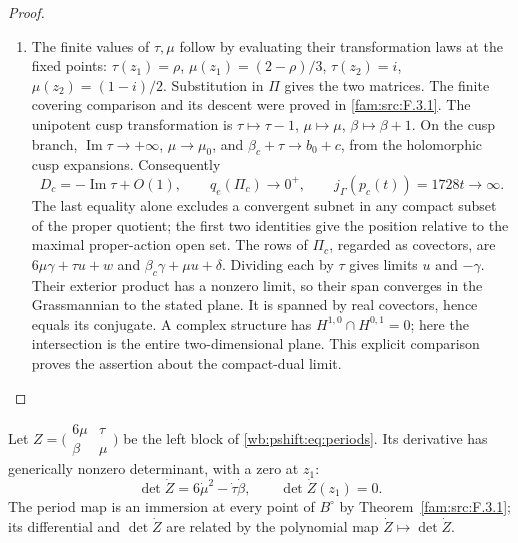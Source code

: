 \begin{proof}
\begin{enumerate}[label=\arabic*.,leftmargin=*]
\item The finite values of $\tau,\mu$ follow by evaluating their transformation
laws at the fixed points: $\tau(z_1)=\rho$,
$\mu(z_1)=(2-\rho)/3$, $\tau(z_2)=i$,
$\mu(z_2)=(1-i)/2$.  Substitution in $\Pi$ gives the two matrices.
The finite covering comparison and its descent were proved in \ref{fam:src:F.3.1}.
The unipotent cusp transformation is
$\tau\mapsto\tau-1$, $\mu\mapsto\mu$, $\beta\mapsto\beta+1$.
On the cusp branch, $\operatorname{Im}\tau\to+\infty$,
$\mu\to\mu_0$, and $\beta_c+\tau\to b_0+c$, from the holomorphic
cusp expansions.  Consequently
\[
 D_c=-\operatorname{Im}\tau+O(1),\qquad
 q_e(\Pi_c)\longrightarrow0^+,
 \qquad j_\Gamma(p_c(t))=1728t\longrightarrow\infty.
\]
The last equality alone excludes a convergent subnet in any compact
subset of the proper quotient; the first two identities give the
position relative to the maximal proper-action open set.
The rows of $\Pi_c$, regarded as covectors, are
$6\mu\gamma+\tau u+w$ and $\beta_c\gamma+\mu u+\delta$.
Dividing each by $\tau$ gives limits $u$ and $-\gamma$.
Their exterior product has a nonzero limit, so their span converges
in the Grassmannian to the stated plane.  It is spanned by real
covectors, hence equals its conjugate.  A complex structure has
$H^{1,0}\cap H^{0,1}=0$; here the intersection is the entire
two-dimensional plane.  This explicit comparison proves the assertion
about the compact-dual limit.
\end{enumerate}
\end{proof}

\begin{proposition}\hypertarget{tag-01RG}{}\label{fam:src:F.3.3}\label{fam:st:F.3.3}

Let $Z=\bigl(\begin{smallmatrix}6\mu&\tau\\\beta&\mu\end{smallmatrix}\bigr)$
be the left block of \eqref{wb:pshift:eq:periods}. Its derivative has
generically nonzero determinant, with a zero at $z_1$:
\[
 \det\dot Z=6\dot\mu^2-\dot\tau\dot\beta,\qquad
 \det\dot Z(z_1)=0.
\]
The period map is an immersion at every point of $B^\circ$ by
Theorem~\ref{fam:src:F.3.1}; its differential and $\det\dot Z$ are
related by the polynomial map $\dot Z\mapsto\det\dot Z$.
\end{proposition}




